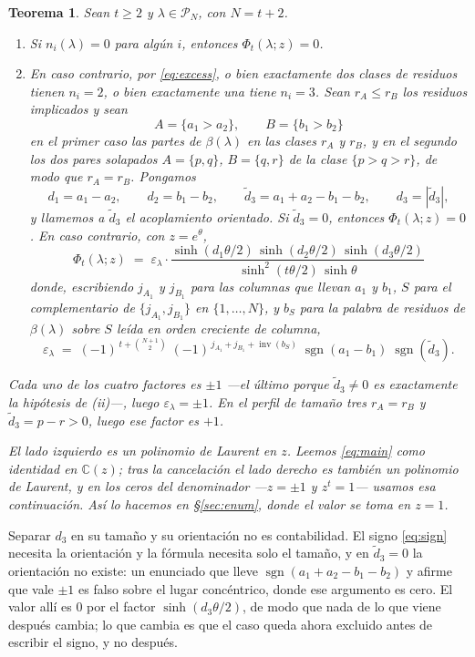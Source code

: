 \documentclass[11pt,reqno]{amsart}
\theoremstyle{plain}
\newtheorem{theorem}{Teorema}[section]
\theoremstyle{definition}
\newcommand{\CC}{\mathbb{C}}
\newcommand{\PP}{\mathcal{P}}
\newcommand{\inv}{\operatorname{inv}}
\newcommand{\sgn}{\operatorname{sgn}}
\begin{document}
\begin{theorem}\label{thm:main}
Sean $t\ge2$ y $\lambda\in\PP_N$, con $N=t+2$.
\begin{enumerate}
\item[\rm(i)] Si $n_i(\lambda)=0$ para algún $i$, entonces $\Phi_t(\lambda;z)=0$.
\item[\rm(ii)] En caso contrario, por \eqref{eq:excess}, o bien exactamente dos clases de residuos
tienen $n_i=2$, o bien exactamente una tiene $n_i=3$. Sean $r_A\le r_B$ los residuos implicados y
sean
\[
A=\{a_1>a_2\},\qquad B=\{b_1>b_2\}
\]
en el primer caso las partes de $\beta(\lambda)$ en las clases $r_A$ y $r_B$, y en el segundo los dos
pares solapados $A=\{p,q\}$, $B=\{q,r\}$ de la clase $\{p>q>r\}$, de modo que $r_A=r_B$. Pongamos
\[
d_1=a_1-a_2,\qquad d_2=b_1-b_2,\qquad
\tilde d_3=a_1+a_2-b_1-b_2,\qquad d_3=|\tilde d_3| ,
\]
y llamemos a $\tilde d_3$ el \emph{acoplamiento orientado}. Si $\tilde d_3=0$, entonces
$\Phi_t(\lambda;z)=0$. En caso contrario, con $z=e^\theta$,
\begin{equation}\label{eq:main}
\boxed{\;\;\Phi_t(\lambda;z)\;=\;\varepsilon_\lambda\cdot
\frac{\sinh(d_1\theta/2)\,\sinh(d_2\theta/2)\,\sinh(d_3\theta/2)}
{\sinh^2(t\theta/2)\,\sinh\theta}\;\;}
\end{equation}
donde, escribiendo $j_{A_1}$ y $j_{B_1}$ para las columnas que llevan $a_1$ y $b_1$, $S$ para el
complementario de $\{j_{A_1},j_{B_1}\}$ en $\{1,\dots,N\}$, y $b_S$ para la palabra de residuos de
$\beta(\lambda)$ sobre $S$ leída en orden creciente de columna,
\begin{equation}\label{eq:sign}
\varepsilon_\lambda\;=\;(-1)^{\,t+\binom{N+1}{2}}\;
(-1)^{\,j_{A_1}+j_{B_1}+\inv(b_S)}\;\sgn(a_1-b_1)\;\sgn(\tilde d_3).
\end{equation}
\end{enumerate}
Cada uno de los cuatro factores es $\pm1$ ---el último porque $\tilde d_3\ne0$ es exactamente la
hipótesis de {\rm(ii)}---, luego $\varepsilon_\lambda=\pm1$. En el perfil de tamaño tres $r_A=r_B$ y
$\tilde d_3=p-r>0$, luego ese factor es $+1$.

El lado izquierdo es un polinomio de Laurent en $z$. Leemos \eqref{eq:main} como identidad en
$\CC(z)$; tras la cancelación el lado derecho es también un polinomio de Laurent, y en los ceros del
denominador ---$z=\pm1$ y $z^t=1$--- usamos esa continuación. Así lo hacemos en \S\ref{sec:enum},
donde el valor se toma en $z=1$.
\end{theorem}

\noindent Separar $d_3$ en su tamaño y su orientación no es contabilidad. El signo \eqref{eq:sign}
necesita la orientación y la fórmula necesita solo el tamaño, y en $\tilde d_3=0$ la orientación no
existe: un enunciado que lleve $\sgn(a_1+a_2-b_1-b_2)$ y afirme que vale $\pm1$ es falso sobre el
lugar concéntrico, donde ese argumento es cero. El valor allí es $0$ por el factor
$\sinh(d_3\theta/2)$, de modo que nada de lo que viene después cambia; lo que cambia es que el caso
queda ahora excluido antes de escribir el signo, y no después.
\end{document}
